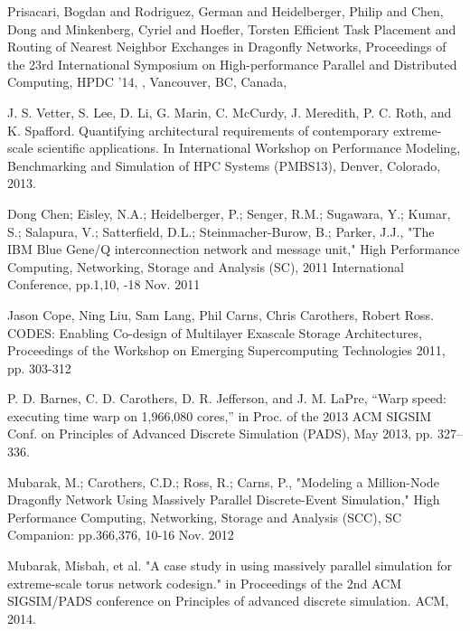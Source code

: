 \documentclass[conference]{IEEEtran}
\begin{document}
\begin{thebibliography}{10}
Prisacari, Bogdan and Rodriguez, German and Heidelberger, Philip and Chen, Dong and Minkenberg, Cyriel and Hoefler, Torsten
\newblock Efficient Task Placement and Routing of Nearest Neighbor Exchanges in Dragonfly Networks,
\newblock Proceedings of the 23rd International Symposium on High-performance Parallel and Distributed Computing,
\newblock HPDC '14,
,
\newblock  Vancouver, BC, Canada,


J. S. Vetter, S. Lee, D. Li, G. Marin, C. McCurdy, J. Meredith, P. C. Roth, and K. Spafford. 
\newblock Quantifying architectural requirements of contemporary extreme-scale scientific applications. 
\newblock In International Workshop on Performance Modeling, Benchmarking and Simulation of HPC Systems (PMBS13), 
\newblock Denver, Colorado, 2013.

Dong Chen; Eisley, N.A.; Heidelberger, P.; Senger, R.M.; Sugawara, Y.; Kumar,
S.; Salapura, V.; Satterfield, D.L.; Steinmacher-Burow, B.; Parker, J.J., 
\newblock "The IBM Blue Gene/Q interconnection network and message unit," 
\newblock High Performance Computing, Networking, Storage and Analysis (SC), 2011 International 
Conference,
\newblock pp.1,10, 
-18 Nov. 2011

Jason Cope, Ning Liu, Sam Lang, Phil Carns, Chris Carothers, Robert Ross.
\newblock CODES: Enabling Co-design of Multilayer Exascale Storage Architectures, 
\newblock Proceedings of the Workshop on Emerging Supercomputing Technologies 2011, pp. 303-312



P. D. Barnes, C. D. Carothers, D. R. Jefferson, and J. M. LaPre, 
\newblock “Warp speed: executing time warp on 1,966,080 cores,”
\newblock in Proc. of the 2013 ACM SIGSIM Conf. on Principles of Advanced Discrete Simulation (PADS),
\newblock May 2013, pp. 327–336.

Mubarak, M.; Carothers, C.D.; Ross, R.; Carns, P.,
\newblock "Modeling a Million-Node Dragonfly Network Using Massively Parallel Discrete-Event Simulation," 
\newblock High Performance Computing, Networking, Storage and Analysis (SCC), 
 SC Companion: 
\newblock pp.366,376, 10-16 Nov. 2012

Mubarak, Misbah, et al.
\newblock "A case study in using massively parallel simulation for extreme-scale torus network codesign." 
\newblock in Proceedings of the 2nd ACM SIGSIM/PADS conference on Principles of advanced discrete simulation. 
\newblock ACM, 2014.


\end{thebibliography}
\end{document}
